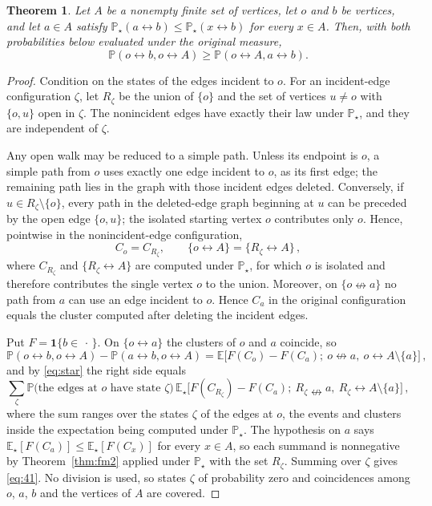 \documentclass[11pt]{article}
\newtheorem{theorem}{Theorem}[section]
\theoremstyle{definition}
\theoremstyle{remark}
\newcommand{\PP}{\mathbb P}
\newcommand{\EE}{\mathbb E}
\newcommand{\one}{\mathbf 1}
\newcommand{\con}{\leftrightarrow}
\newcommand{\ncon}{\nleftrightarrow}
\begin{document}
\begin{theorem}\label{thm:q9}
Let $A$ be a nonempty finite set of vertices, let $o$ and $b$ be vertices, and let $a\in A$
satisfy $\PP_\star(a\con b)\leq\PP_\star(x\con b)$ for every $x\in A$. Then, with both
probabilities below evaluated under the original measure,
\[
 \PP(o\con b,o\con A)\geq\PP(o\con A,a\con b).
\]
\end{theorem}

\begin{proof}
Condition on the states of the edges incident to $o$. For an incident-edge configuration
$\zeta$, let
$R_\zeta$ be the union of $\{o\}$ and the set of vertices $u\neq o$ with $\{o,u\}$ open in
$\zeta$. The nonincident edges have exactly their law under $\PP_\star$, and they
are independent of $\zeta$.

Any open walk may be reduced to a simple path. Unless its endpoint is $o$, a simple path
from $o$ uses exactly one edge incident to $o$, as its first edge; the remaining path lies
in the graph with those incident edges deleted. Conversely, if
$u\in R_\zeta\setminus\{o\}$, every path in the deleted-edge graph beginning at $u$ can be
preceded by the open edge $\{o,u\}$; the isolated starting vertex $o$ contributes only
$o$. Hence, pointwise in the nonincident-edge configuration,
\begin{equation}\label{eq:star}
 C_o=C_{R_\zeta},\qquad \{o\con A\}=\{R_\zeta\con A\}\,,
\end{equation}
where $C_{R_\zeta}$ and $\{R_\zeta\con A\}$ are computed under $\PP_\star$, for which $o$ is isolated and therefore
contributes the single vertex $o$ to the union. Moreover, on $\{o\ncon a\}$ no path from
$a$ can use an edge incident to $o$. Hence $C_a$ in the original configuration equals the
cluster computed after deleting the incident edges.

Put $F=\one\{b\in\,\cdot\,\}$. On $\{o\con a\}$ the clusters of $o$ and $a$ coincide, so
\[
 \PP(o\con b,o\con A)-\PP(a\con b,o\con A)
 =\EE\bigl[F(C_o)-F(C_a);\ o\ncon a,\ o\con A\setminus\{a\}\bigr]\,,
\]
and by \eqref{eq:star} the right side equals
\[
 \sum_{\zeta}\PP\bigl(\text{the edges at $o$ have state }\zeta\bigr)\,
 \EE_\star\bigl[F(C_{R_\zeta})-F(C_a);\ R_\zeta\ncon a,\
 R_\zeta\con A\setminus\{a\}\bigr]\,,
\]
where the sum ranges over the states $\zeta$ of the edges at $o$,
the events and clusters inside the expectation being computed under $\PP_\star$. The
hypothesis on $a$ says $\EE_\star[F(C_a)]\leq\EE_\star[F(C_x)]$ for every $x\in A$, so each
summand is nonnegative by Theorem~\ref{thm:fm2} applied under $\PP_\star$ with the set
$R_\zeta$. Summing over $\zeta$ gives \eqref{eq:41}. No division is used, so states $\zeta$ of
probability zero and coincidences among $o$, $a$, $b$ and the vertices of $A$ are covered.
\end{proof}
\end{document}
